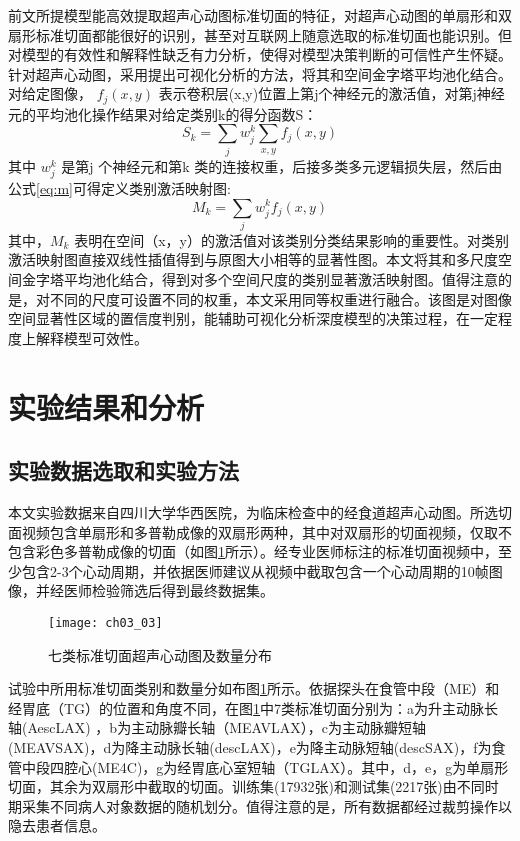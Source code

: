  前文所提模型能高效提取超声心动图标准切面的特征，对超声心动图的单扇形和双扇形标准切面都能很好的识别，甚至对互联网上随意选取的标准切面也能识别。但对模型的有效性和解释性缺乏有力分析，使得对模型决策判断的可信性产生怀疑。
针对超声心动图，采用提出可视化分析的方法，将其和空间金字塔平均池化结合。对给定图像， $f_{j}(x,y)$ 表示卷积层(x,y)位置上第j个神经元的激活值，对第j神经元的平均池化操作结果对给定类别k的得分函数S：
\begin{equation} \label{eq:s}
     S_{k}=\sum_{j}w_{j}^{k}\sum_{x,y}f_{j}(x,y)
\end{equation}	    
其中 $w_{j}^{k}$ 是第j 个神经元和第k 类的连接权重，后接多类多元逻辑损失层，然后由公式\ref{eq:m}可得定义类别激活映射图:	
  	      \begin{equation} \label{eq:m}
     M_{k}=\sum_{j}w_{j}^{k}f_{j}(x,y)
\end{equation}
其中，$M_{k}$ 表明在空间（x，y）的激活值对该类别分类结果影响的重要性。对类别激活映射图直接双线性插值得到与原图大小相等的显著性图。本文将其和多尺度空间金字塔平均池化结合，得到对多个空间尺度的类别显著激活映射图。值得注意的是，对不同的尺度可设置不同的权重，本文采用同等权重进行融合。该图是对图像空间显著性区域的置信度判别，能辅助可视化分析深度模型的决策过程，在一定程度上解释模型可效性。

\section{实验结果和分析}
\subsection{实验数据选取和实验方法}

本文实验数据来自四川大学华西医院，为临床检查中的经食道超声心动图。所选切面视频包含单扇形和多普勒成像的双扇形两种，其中对双扇形的切面视频，仅取不包含彩色多普勒成像的切面（如图\ref{fig:ch03_03}所示）。经专业医师标注的标准切面视频中，至少包含2-3个心动周期，并依据医师建议从视频中截取包含一个心动周期的10帧图像，并经医师检验筛选后得到最终数据集。
\begin{figure}[!htbp]
\centering
\texttt{[image: ch03\_03]}
\caption{七类标准切面超声心动图及数量分布}
\label{fig:ch03_03}
\end{figure}

试验中所用标准切面类别和数量分如布图\ref{fig:ch03_03}所示。依据探头在食管中段（ME）和经胃底（TG）的位置和角度不同，在图\ref{fig:ch03_03}中7类标准切面分别为：a为升主动脉长轴(AescLAX) ，b为主动脉瓣长轴（MEAVLAX），c为主动脉瓣短轴(MEAVSAX)，d为降主动脉长轴(descLAX)，e为降主动脉短轴(descSAX)，f为食管中段四腔心(ME4C)，g为经胃底心室短轴（TGLAX）。其中，d，e，g为单扇形切面，其余为双扇形中截取的切面。训练集(17932张)和测试集(2217张)由不同时期采集不同病人对象数据的随机划分。值得注意的是，所有数据都经过裁剪操作以隐去患者信息。
